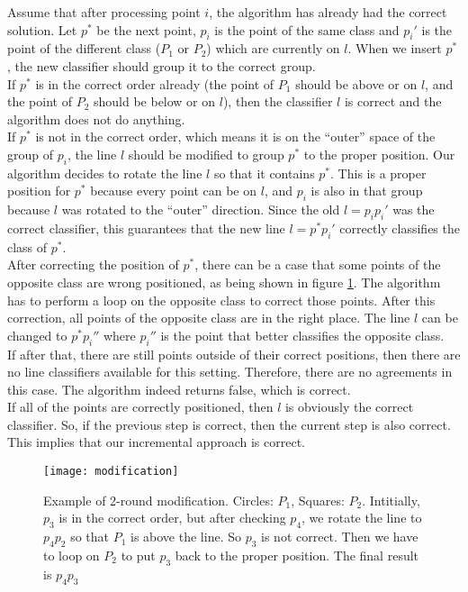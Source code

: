 Assume that after processing point $i$, the algorithm has already had the correct solution. Let $p^*$ be the next point, $p_i$ is the point of the same class and $p_i'$ is the point of the different class ($P_1$ or $P_2$) which are 
currently on $l$. When we insert $p^*$, the new classifier should group it to the correct group. \\

If $p^*$ is in the correct order already (the point of $P_1$ should be above or on $l$, and the point of $P_2$ should be below or on $l$), then the classifier $l$ is correct and
the algorithm does not do anything. \\

If $p^*$ is not in the correct order, which means it is on the ``outer'' space of the group of $p_i$, the line $l$ should be modified to group $p^*$ to the proper position. Our algorithm decides to rotate the line $l$ so that it contains $p^*$. This is a proper position for $p^*$ because every point can be on $l$, and $p_i$ is also in that group because $l$ was rotated to the ``outer'' direction. Since the old $l = p_i p_i'$ was the correct classifier, this guarantees that the new line $l = p^* p_i'$ correctly classifies the class of $p^*$. \\ 

After correcting the position of $p^*$, there can be a case that some points of the opposite class are wrong positioned, as being shown in figure \ref{fig:modification}. The algorithm has to perform a loop on the opposite class to correct those points. After this correction, all points of the opposite class are in the right place. The line $l$ can be changed to $p^* p_i''$ where $p_i''$ is the point that better classifies the opposite class. \\

If after that, there are still points outside of their correct positions, then there are no line classifiers available for this setting. Therefore, there are no agreements in this case. The algorithm indeed returns false, which is correct. \\

If all of the points are correctly positioned, then $l$ is obviously the correct classifier. 
So, if the previous step is correct, then the current step is also correct. This implies that our incremental approach is correct. \\

\begin{figure}[h]
\centering
\texttt{[image: modification]}\\
\caption{Example of 2-round modification. Circles: $P_1$, Squares: $P_2$. 
Intitially, $p_3$ is in the correct order, but after checking $p_4$, we rotate the line to $p_4 p_2$ so that $P_1$ is above the line. So $p_3$ is not correct. Then we have to loop on $P_2$ to put $p_3$ back to the proper position. The final result is $p_4 p_3$} 
\label{fig:modification}
\end{figure}


